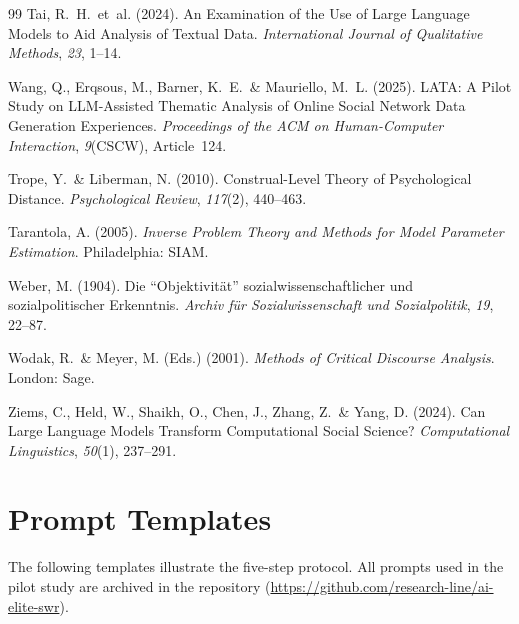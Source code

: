 \documentclass[11pt,a4paper]{article}
\begin{document}
\begin{thebibliography}{99}
  Tai, R.~H.~et~al. (2024).
  An Examination of the Use of Large Language Models to Aid Analysis of Textual Data.
  \textit{International Journal of Qualitative Methods}, \textit{23}, 1--14.

  Wang, Q., Erqsous, M., Barner, K.~E.~\& Mauriello, M.~L. (2025).
  LATA: A Pilot Study on LLM-Assisted Thematic Analysis of Online Social Network Data Generation Experiences.
  \textit{Proceedings of the ACM on Human-Computer Interaction}, \textit{9}(CSCW), Article~124.

  Trope, Y.~\& Liberman, N. (2010).
  Construal-Level Theory of Psychological Distance.
  \textit{Psychological Review}, \textit{117}(2), 440--463.

  Tarantola, A. (2005).
  \textit{Inverse Problem Theory and Methods for Model Parameter Estimation}.
  Philadelphia: SIAM.

  Weber, M. (1904).
  Die ``Objektivit\"at'' sozialwissenschaftlicher und sozialpolitischer Erkenntnis.
  \textit{Archiv f\"ur Sozialwissenschaft und Sozialpolitik}, \textit{19}, 22--87.

  Wodak, R.~\& Meyer, M. (Eds.) (2001).
  \textit{Methods of Critical Discourse Analysis}.
  London: Sage.

  Ziems, C., Held, W., Shaikh, O., Chen, J., Zhang, Z.~\& Yang, D. (2024).
  Can Large Language Models Transform Computational Social Science?
  \textit{Computational Linguistics}, \textit{50}(1), 237--291.

\end{thebibliography}


\newpage
\appendix

\section{Prompt Templates}
\label{app:prompts}

The following templates illustrate the five-step protocol. All prompts used in the pilot study are archived in the repository (\url{https://github.com/research-line/ai-elite-swr}).
\end{document}

